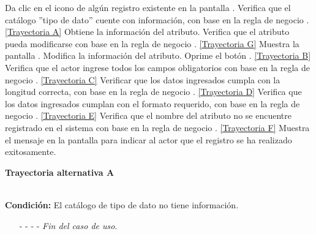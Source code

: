 	\begin{UCtrayectoria}
		\UCpaso[\UCactor] Da clic en el icono \editar de algún registro existente en la pantalla .
		\UCpaso[\UCsist] Verifica que el catálogo ''tipo de dato'' cuente con información, con base en la regla de negocio . \hyperlink{CU7-1-2:TAA}{[Trayectoria A]}
		\UCpaso[\UCsist] Obtiene la información del atributo.
		\UCpaso[\UCsist] Verifica que el atributo pueda modificarse con base en la regla de negocio . \hyperlink{CU7-1-2:TAF}{[Trayectoria G]}
		\UCpaso[\UCsist] Muestra la pantalla .
		\UCpaso[\UCactor] Modifica la información del atributo. \label{CU7.1.2-P4}
		\UCpaso[\UCactor] Oprime el botón . \hyperlink{CU7-1-2:TAB}{[Trayectoria B]}
		\UCpaso[\UCsist] Verifica que el actor ingrese todos los campos obligatorios con base en la regla de negocio . \hyperlink{CU7-1-2:TAC}{[Trayectoria C]}
		\UCpaso[\UCsist] Verificar que los datos ingresados cumpla con la longitud correcta, con base en la regla de negocio . \hyperlink{CU7-1-2:TAD}{[Trayectoria D]}
		\UCpaso[\UCsist] Verifica que los datos ingresados cumplan con el formato requerido, con base en la regla de negocio . \hyperlink{CU7-1-2:TAE}{[Trayectoria E]}
		\UCpaso[\UCsist] Verifica que el nombre del atributo no se encuentre registrado en el sistema con base en la regla de negocio . \hyperlink{CU7-1-2:TAF}{[Trayectoria F]}
		\UCpaso[\UCsist] Muestra el mensaje  en la pantalla  para indicar al actor que el registro se ha realizado exitosamente.
	\end{UCtrayectoria}		
\hypertarget{CU7-1-2:TAA}{\textbf{Trayectoria alternativa A}}\\
\noindent \textbf{Condición:} El catálogo de tipo de dato no tiene información.
\begin{enumerate}
	\UCpaso[\UCsist] Muestra el mensaje  en la pantalla  para indicar que no es posible realizar la operación debido a la falta de información necesaria para el sistema.
	\item[- -] - - {\em {Fin del caso de uso}}.%
\end{enumerate}
